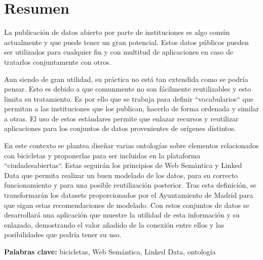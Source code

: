 \chapter{Resumen}

La publicación de datos abierto por parte de instituciones es algo común actualmente y que puede tener un gran potencial. Estos datos públicos pueden ser utilizados para cualquier fin y con multitud de aplicaciones en caso de tratarlos conjuntamente con otros.


Aun siendo de gran utilidad, su práctica no está tan extendida como se podría pensar. Esto es debido a que comunmente no son fácilmente reutilizables y esto limita su tratamiento. Es por ello que se trabaja para definir ``vocabularios`` que permitan a las instituciones que los publican, hacerlo de forma ordenada y similar a otras. El uso de estos estándares permite que enlazar recursos y reutilizar aplicaciones para los conjuntos de datos provenientes de orígenes distintos.


En este contexto se plantea diseñar varias ontologías sobre elementos relacionados con bicicletas y proponerlas para ser incluidas en la plataforma ``ciudadesabiertas``. Estas seguirán los principios de Web Semántica y Linked Data que permita realizar un buen modelado de los datos, para su correcto funcionamiento y para una posible reutilización posterior. Tras esta definición, se transformarán los datasets proporcionados por el Ayuntamiento de Madrid para que sigan estas recomendaciones de modelado. Con estos conjuntos de datos se desarrollará una aplicación que muestre la utilidad de esta información y su enlazado, demostrando el valor añadido de la conexión entre ellos y las posibilidades que podría tener su uso.
\newline

\textbf{Palabras clave:} bicicletas, Web Semántica, Linked Data, ontología

